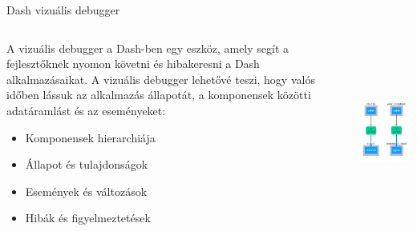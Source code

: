 \documentclass[english, aspectratio=169]{beamer}
\begin{document}
	\begin{frame}{Dash vizuális debugger}
		\begin{columns}
			\begin{column}{.5\textwidth}
				A vizuális debugger a Dash-ben egy eszköz, amely segít a fejlesztőknek nyomon követni és hibakeresni a Dash alkalmazásaikat. A vizuális debugger lehetővé teszi, hogy valós időben lássuk az alkalmazás állapotát, a komponensek közötti adatáramlást és az eseményeket:
				\begin{itemize}
					\item Komponensek hierarchiája
					\item Állapot és tulajdonságok
					\item Események és változások
					\item Hibák és figyelmeztetések
				\end{itemize}
			\end{column}
			\begin{column}{.5\textwidth}
				\begin{center}
					\includegraphics[width=7cm, height=6cm, keepaspectratio]{images/plots_6.png}
				\end{center}
			\end{column}
		\end{columns}
	\end{frame}
	
\end{document}
